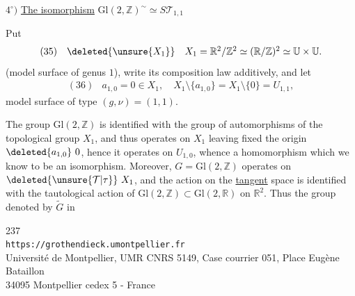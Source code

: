 
$4^\circ)$ \uline{The isomorphism} $\mathrm{Gl}(2,\mathbb Z)^{\sim}\simeq S\mathcal T_{1,1}$

\margin{$\unsure{\checkmark}$}
Put
\[
\begin{array}{ll}
(35)&\deleted{\unsure{X_1}}\quad X_1=\mathbb R^2/\mathbb Z^2\simeq(\mathbb R/\mathbb Z)^2\simeq\mathbb U\times\mathbb U.
\end{array}
\]
(model surface of genus $1$), write its composition law additively, and let
\[
\begin{array}{ll}
(36)&a_{1,0}=0\in X_1,\quad X_1\setminus\{a_{1,0}\}=X_1\setminus\{0\}=U_{1,1},
\end{array}
\]
model surface of type $(g,\nu)=(1,1)$.

The group $\mathrm{Gl}(2,\mathbb Z)$ is identified with the group of automorphisms of the topological group $X_1$, and thus operates on $X_1$ leaving fixed the origin $\deleted{a_{1,0}}\ 0$, hence it operates on $U_{1,0}$, whence a homomorphism
which we know to be an isomorphism. Moreover, $G=\mathrm{Gl}(2,\mathbb Z)$ operates  on $\deleted{\unsure{\mathcal T|\tau}}\ X_1$, and the action on the \uline{tangent} space is identified with the tautological action of $\mathrm{Gl}(2,\mathbb Z)\subset\mathrm{Gl}(2,\mathbb R)$ on $\mathbb R^2$. Thus the group denoted by $\widetilde G$ in


\begin{center}
237\\
\texttt{https://grothendieck.umontpellier.fr}\\
Université de Montpellier, UMR CNRS 5149, Case courrier 051, Place Eugène Bataillon\\
34095 Montpellier cedex 5 - France
\end{center}


